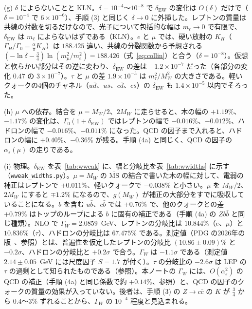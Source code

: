 \documentclass[a4paper,10pt]{ltjsarticle}
\newcommand{\MSbar}{\overline{\mathrm{MS}}}
\begin{document}
(g) $\delta$ によらないことと KLN。$\delta=10^{-4}$〜$10^{-8}$ で $\delta_{\mathrm{EW}}$ の変化は $O(\delta)$ だけで（$\delta=10^{-4}$ で $6\times10^{-6}$）、手順 (3) と同じく $\delta\to0$ に外挿した。レプトンの質量は共線の対数を切るだけなので、光子について包括的な幅は $m_\ell\to0$ で有限で、$\delta_{\mathrm{EW}}$ は $m_\ell$ によらないはずである（KLN）。$e$ と $\mu$ では、硬い放射の $K_H$（$\Gamma_H/\Gamma_0=\frac\alpha\pi K_H$）は $188.425$ 違い、共線の分裂関数から予想される $(-\ln\delta-\frac34)\ln(m_\mu^2/m_e^2)=188.426$（式~\eqref{eq:collin}）と合う（$\delta=10^{-8}$）。仮想と軟らかい部分はその逆に変わり、$\delta_{\mathrm{EW}}$ の差は $-1.2\times10^{-7}$ だった（各部分の変化 $0.47$ の $3\times10^{-7}$）。$\tau$ と $\mu$ の差 $1.9\times10^{-5}$ は $m_\tau^2/M_W^2$ の大きさである。軽いクォークの4個のチャネル（$u\bar d$、$u\bar s$、$c\bar d$、$c\bar s$）の $\delta_{\mathrm{EW}}$ も $1.4\times10^{-5}$ 以内でそろった。

(h) $\mu$ への依存。結合を $\mu=M_W/2$、$2M_W$ に走らせると、木の幅の $+1.19\%$、$-1.17\%$ の変化は、$\Gamma_0(1+\delta_{\mathrm{EW}})$ ではレプトンの幅で $-0.016\%$、$-0.012\%$、ハドロンの幅で $-0.016\%$、$-0.011\%$ になった。QCD の因子まで入れると、ハドロンの幅に $+0.40\%$、$-0.36\%$ が残る。手順 (4a) と同じく、QCD の因子の $\alpha_s(\mu)$ の走りである。

(i) 物理。$\delta_{\mathrm{EW}}$ を表~\ref{tab:wweak} に、幅と分岐比を表~\ref{tab:wwidths} に示す（\texttt{wweak\_widths.py}）。$\mu=M_W$ の $\MSbar$ の結合で書いた木の幅に対して、電弱の補正はレプトンで $+0.011\%$、軽いクォークで $-0.038\%$ と小さい。$\mu$ を $M_W/2$、$2M_W$ にすると $\mp1.2\%$ になるので、$g(M_W)$ が補正の大部分をすでに吸収していることになる。$b$ を含む $u\bar b$、$c\bar b$ では $+0.76\%$ で、他のクォークとの差 $+0.79\%$ はトップのループによる $b$ に固有の補正である（手順 (4a) の $Zb\bar b$ と同じ種類）。NLO で $\Gamma_W=2.0859$~GeV、レプトンの分岐比は $10.844\%$（$e$、$\mu$）と $10.836\%$（$\tau$）、ハドロンの分岐比は $67.475\%$ である。測定値（PDG の2026年の版~\cite{pdg26}、参照）とは、普遍性を仮定したレプトンの分岐比 $(10.86\pm0.09)\%$ と $-0.2\sigma$、ハドロンの分岐比と $+0.2\sigma$ で合う。$\Gamma_W$ は $-1.1\sigma$ である（測定値 $2.14\pm0.05$~GeV には尺度因子 $S=1.7$ が付く）。$\tau$ の分岐比の $-2.6\sigma$ は LEP の $\tau$ の過剰として知られたものである（参照）。本ノートの $\Gamma_W$ には、$O(\alpha_s^2)$ の QCD の補正（手順 (4a) と同じ係数で約 $+0.14\%$、参照）と、QCD の因子のクォークの質量の効果が入っていない。後者は、手順 (3) の $Z\to c\bar c$ の $K$ が $\frac34$ から $0.4$〜$3\%$ ずれることから、$\Gamma_W$ の $10^{-4}$ 程度と見込まれる。
\end{document}
